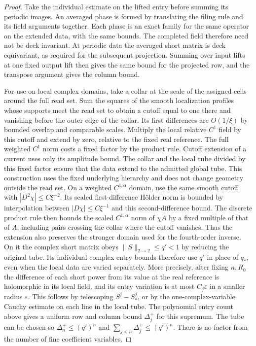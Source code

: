 \documentclass[11pt,letterpaper,reqno]{amsart}
\numberwithin{equation}{section}
\theoremstyle{definition}
\theoremstyle{remark}
\begin{document}
\begin{proof}
Take the individual estimate on the lifted entry before summing its
periodic images. An averaged phase is formed by translating the filing
rule and its field arguments together. Each phase is an exact family
for the same operator on the extended data, with the same bounds.
The completed field therefore need not be deck invariant. At periodic
data the averaged short matrix is deck equivariant, as required for
the subsequent projection. Summing over input lifts at one fixed
output lift then gives the same bound for the projected row, and the
transpose argument gives the column bound.

For use on local complex domains, take a collar at the scale of the assigned cells around the full read set. Sum the squares of the smooth localization profiles whose supports meet the read set to obtain a cutoff equal to one there and vanishing before the outer edge of the collar. Its first differences are \(O(1/\xi)\) by bounded overlap and comparable scales. Multiply the local relative \(C^1\) field by this cutoff and extend by zero, relative to the fixed real reference. The full weighted \(C^1\) norm costs a fixed factor by the product rule. Cutoff extension of a current uses only its amplitude bound. The collar and the local tube divided by this fixed factor ensure that the data extend to the admitted global tube. This construction uses the fixed underlying hierarchy and does not change geometry outside the read set. On a weighted \(C^{1,\alpha}\) domain, use the same smooth cutoff with \(|D^2\chi|\le C\xi^{-2}\). Its scaled first-difference H\"older norm is bounded by interpolation between \(|D\chi|\le C\xi^{-1}\) and this second-difference bound. The discrete product rule then bounds the scaled \(C^{1,\alpha}\) norm of \(\chi A\) by a fixed multiple of that of \(A\), including pairs crossing the collar where the cutoff vanishes. Thus the extension also preserves the stronger domain used for the fourth-order inverse. On it the complex short matrix obeys \(\|S\|_{2\to2}\le q'<1\) by reducing the original tube. Its individual complex entry bounds therefore use \(q'\) in place of \(q_*\), even when the local data are varied separately. More precisely, after fixing \(n,R_0\) the difference of each short power from its value at the real reference is holomorphic in its local field, and its entry variation is at most \(C_j\varepsilon\) in a smaller radius \(\varepsilon\). This follows by telescoping \(S^j-S_*^j\), or by the one-complex-variable Cauchy estimate on each line in the local tube. The polynomial entry count above gives a uniform row and column bound \(\Delta_j^+\) for this supremum. The tube can be chosen so \(\Delta_n^+\le(q')^n\) and \(\sum_{j<n}\Delta_j^+\le(q')^n\). There is no factor from the number of fine coefficient variables.


\end{proof}
\end{document}
